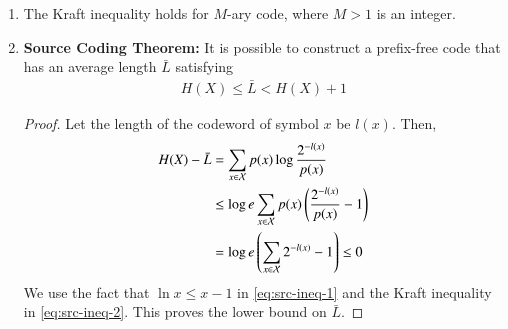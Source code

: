 \documentclass[journal,12pt,twocolumn]{IEEEtran}
\renewcommand\thesection{\arabic{section}}
\begin{document}
\begin{enumerate}[label=\thesection.\arabic*, ref=\thesection.\theenumi]
\begin{proof}
        To prove the sufficient condition, note that the total number of terminal 
        nodes eliminated is upto $2^{n_L}$. Thus,
        \begin{align}
            \sum_{i=1}^L2^{n_L-n_i} &\le 2^{n_L} \\
            \implies \sum_{i=1}^L2^{-n_i} &\le 1
            \label{eq:kraft-sufficient}
        \end{align} 
    \end{proof}
    \item The Kraft inequality holds for $M$-ary code, where $M > 1$ is an integer.
    \item \textbf{Source Coding Theorem:} It is possible to construct a 
    prefix-free code that has an average length $\bar{L}$ satisfying
    \begin{align}
        H(X) \le \bar{L} < H(X) + 1
        \label{eq:source-coding}
    \end{align}
    \begin{proof}
        Let the length of the codeword of symbol $x$ be $l(x)$. Then,
        \begin{align}
            H(X) - \bar{L} &= \sum_{x\in\mathcal{X}}p(x)\log\frac{2^{-l(x)}}{p(x)} \label{eq:src-ineq-1} \\
            &\le \log e\sum_{x\in\mathcal{X}}p(x)\left(\frac{2^{-l(x)}}{p(x)} - 1\right) \\
            &= \log e\left(\sum_{x\in\mathcal{X}}2^{-l(x)}-1\right) \le 0
            \label{eq:src-ineq-2}
        \end{align}
        We use the fact that $\ln x \le x - 1$ in \eqref{eq:src-ineq-1} and the 
        Kraft inequality in \eqref{eq:src-ineq-2}. This proves the lower bound
        on $\bar{L}$.


\end{proof}
\end{enumerate}
\end{document}
